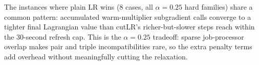 The instances where plain LR wins (8 cases, all $\alpha=0.25$ hard families)
share a common pattern: accumulated warm-multiplier subgradient calls converge
to a tighter final Lagrangian value than cutLR's richer-but-slower steps reach
within the 30-second refresh cap.  This is the $\alpha=0.25$ tradeoff: sparse
job-processor overlap makes pair and triple incompatibilities rare, so the extra
penalty terms add overhead without meaningfully cutting the relaxation.
